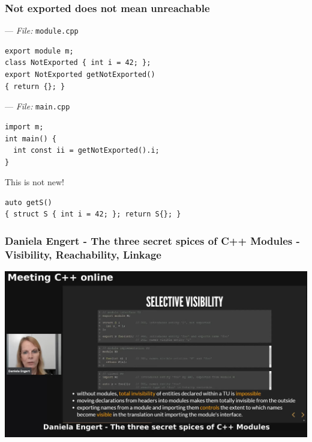 \documentclass[aspectratio=169]{beamer}
\newif\iftransitions
\newcommand{\cpause}{\iftransitions \pause \fi}
\begin{document}
\begin{frame}[fragile]
  \frametitle{Not exported does not mean unreachable}

  --- \textit{File:} \texttt{module.cpp}
  \begin{lstlisting}[style=cpp20]
export module m;
class NotExported { int i = 42; };
export NotExported getNotExported()
{ return {}; }
  \end{lstlisting}
  \cpause
  --- \textit{File:} \texttt{main.cpp}
  \begin{lstlisting}[style=cpp20]
import m;
int main() {
  int const ii = getNotExported().i;
}
  \end{lstlisting}
  \cpause
  This is not new!
  \begin{lstlisting}[style=cpp20]
auto getS()
{ struct S { int i = 42; }; return S{}; }
  \end{lstlisting}

\end{frame}

\begin{frame}
  \frametitle{Daniela Engert - The three secret spices of C++ Modules - \\ Visibility, Reachability, Linkage}
  \begin{center}
    \href{https://www.youtube.com/watch?v=l_83lyxWGtE}
    {\includegraphics[height=.8\textheight]{modulesgfx/engert_three_spices.jpg}}
  \end{center}
\end{frame}
\end{document}
